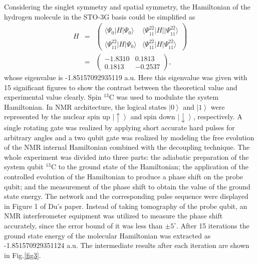 \documentclass[8.5pt,twoside,twocolumn]{article}
\begin{document}
Considering the singlet symmetry and spatial symmetry, the Hamiltonian of the hydrogen molecule in the STO-3G basis could be simplified as\cite{Hydrogen}
\begin{eqnarray}
        H&=&
        \begin{pmatrix}
            \langle\Psi_0|H|\Psi_0\rangle & \langle\Psi_{1\bar{1}}^{2\bar{2}}|H||\Psi_{1\bar{1}}^{2\bar{2}}\rangle\\
            \langle\Psi_{1\bar{1}}^{2\bar{2}}|H|\Psi_0\rangle & \langle\Psi_{1\bar{1}}^{2\bar{2}}|H|\Psi_{1\bar{1}}^{2\bar{2}}\rangle
            \end{pmatrix}\nonumber\\
        &=& \begin{pmatrix}
            -1.8310 & 0.1813\\
            0.1813 & -0.2537
            \end{pmatrix},
\end{eqnarray}
whose eigenvalue is -1.85157092935119 a.u. Here this eigenvalue was given with 15 significant figures to show the contrast between the theoretical value and experimental value clearly.
Spin $^{13}$C was used to modulate the system Hamiltonian.
In NMR architecture, the logical states $\left\vert 0 \right\rangle$
and $\left\vert 1 \right\rangle$ were represented by the nuclear
spin up $\left\vert \uparrow \right\rangle$ and
spin down $\left\vert \downarrow \right\rangle$, respectively.
A single rotating gate was realized by applying short accurate hard
pulses for arbitrary angles and a two qubit gate was realized
by modeling the free evolution of the NMR internal Hamiltonian
combined with the decoupling technique.\cite{NMR_review_1}
The whole experiment was divided into three parts:
the adiabatic preparation of the system qubit $^{13}$C to
the ground state of the Hamiltonian; the application of the
controlled evolution of the Hamiltonian
to produce a phase shift on the probe qubit;
and the measurement of the phase shift to obtain
the value of the ground state energy.
The network and the corresponding pulse sequence were
displayed in Figure 1 of Du's paper.\cite{NMR_static}
Instead of taking tomography of the probe qubit,
an NMR interferometer equipment was utilized to measure
the phase shift accurately, since the error bound of it
was less than $\pm 5^{\circ}$. After 15 iterations the ground
state energy of the molecular Hamiltonian was extracted as
 -1.851570929351124 a.u.
The intermediate results after each iteration are
shown in Fig.\ref{fig3}.
\end{document}
